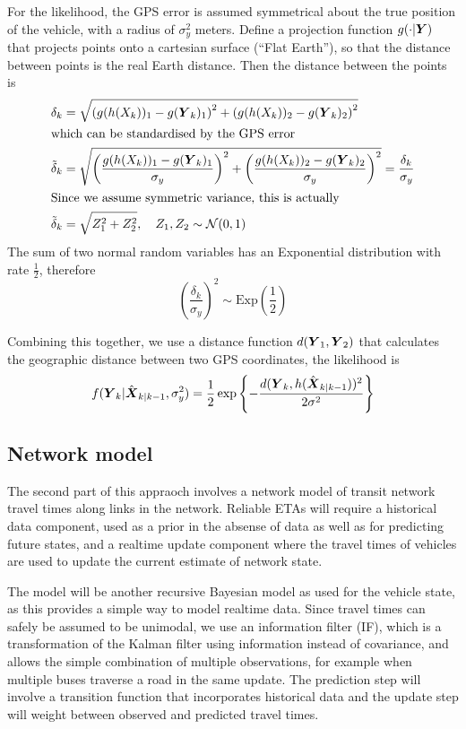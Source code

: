 For the likelihood, the GPS error is assumed symmetrical about the true
position of the vehicle, with a radius of $\sigma_y^2$ meters.
Define a projection function $g(\cdot | \mbox{$\boldsymbol{Y}$})$ that projects points
onto a cartesian surface (``Flat Earth''),
so that the distance between points is the real Earth distance.
Then the distance between the points is
\begin{align*}
\delta_k &= \sqrt{\left(g(h(X_k))_1 - g(\mbox{$\boldsymbol{Y}$}_k)_1\right)^2 +
    \left(g(h(X_k))_2 - g(\mbox{$\boldsymbol{Y}$}_k)_2\right)^2} \\
\intertext{which can be standardised by the GPS error}
\tilde \delta_k &=
\sqrt{\left(\frac{g(h(X_k))_1 - g(\mbox{$\boldsymbol{Y}$}_k)_1}{\sigma_y}\right)^2 +
    \left(\frac{g(h(X_k))_2 - g(\mbox{$\boldsymbol{Y}$}_k)_2}{\sigma_y}\right)^2} =\frac{\delta_k}{\sigma_y} \\
\intertext{Since we assume symmetric variance, this is actually}
\tilde\delta_k &= \sqrt{Z_1^2 + Z_2^2}, \quad
Z_1,Z_2 \sim \mathcal{N}(0,1)
\end{align*}
The sum of two normal random variables has an Exponential distribution with rate $\frac{1}{2}$,
therefore 
\begin{equation}
\label{eq:lhood_exp}
\left(\frac{\delta_k}{\sigma_y}\right)^2 \sim \mathrm{Exp}\left(\frac{1}{2}\right)
\end{equation}

Combining this together, we use a distance function $d(\mbox{$\boldsymbol{Y}$}_1, \mbox{$\boldsymbol{Y}$}_2)$ that calculates
the geographic distance between two GPS coordinates,
the likelihood is
\begin{equation}
\label{eq:lhood}
f(\mbox{$\boldsymbol{Y}$}_k | \hat{\mbox{$\boldsymbol{X}$}}_{k|k-1}, \sigma_y^2) =
\frac{1}{2} \exp\left\{-\frac{d(\mbox{$\boldsymbol{Y}$}_k, h(\hat{\mbox{$\boldsymbol{X}$}}_{k|k-1}))^2}{2\sigma^2}\right\}
\end{equation}


\subsection{Network model}
\label{sec:kf}

The second part of this appraoch involves a network model of transit network travel times along links in the network.
Reliable ETAs will require a historical data component,
used as a prior in the absense of data as well as for
predicting future states, 
and a realtime update component where the travel times of vehicles
are used to update the current estimate of network state.

The model will be another recursive Bayesian model as used for the vehicle state,
as this provides a simple way to model realtime data.
Since travel times can safely be assumed to be unimodal,
we use an information filter (IF),
which is a transformation of the Kalman filter
using information instead of covariance,
and allows the simple combination of multiple observations,
for example when multiple buses traverse a road in the same update.
The prediction step will involve a transition function that incorporates historical data
and the update step will weight between observed and predicted travel times.

